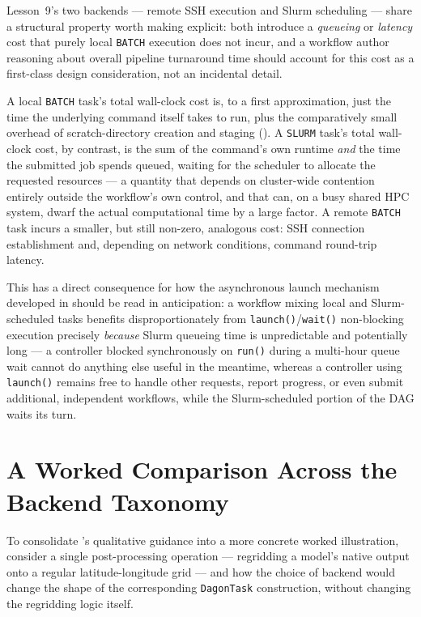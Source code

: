 Lesson~9's two backends --- remote SSH execution and Slurm scheduling ---
share a structural property worth making explicit: both introduce a
\emph{queueing} or \emph{latency} cost that purely local \texttt{BATCH}
execution does not incur, and a workflow author reasoning about overall
pipeline turnaround time should account for this cost as a first-class
design consideration, not an incidental detail.

A local \texttt{BATCH} task's total wall-clock cost is, to a first
approximation, just the time the underlying command itself takes to run,
plus the comparatively small overhead of scratch-directory creation and
staging (). A \texttt{SLURM} task's total wall-clock
cost, by contrast, is the sum of the command's own runtime \emph{and} the
time the submitted job spends queued, waiting for the scheduler to allocate
the requested resources --- a quantity that depends on cluster-wide
contention entirely outside the workflow's own control, and that can, on a
busy shared HPC system, dwarf the actual computational time by a large
factor. A remote \texttt{BATCH} task incurs a smaller, but still non-zero,
analogous cost: SSH connection establishment and, depending on network
conditions, command round-trip latency.

\begin{practicebox}
This has a direct consequence for how the asynchronous launch mechanism
developed in  should be read in anticipation: a
workflow mixing local and Slurm-scheduled tasks benefits disproportionately
from \texttt{launch()}/\texttt{wait()} non-blocking execution precisely
\emph{because} Slurm queueing time is unpredictable and potentially long ---
a controller blocked synchronously on \texttt{run()} during a multi-hour
queue wait cannot do anything else useful in the meantime, whereas a
controller using \texttt{launch()} remains free to handle other requests,
report progress, or even submit additional, independent workflows, while
the Slurm-scheduled portion of the DAG waits its turn.
\end{practicebox}

\section{A Worked Comparison Across the Backend Taxonomy}

To consolidate 's qualitative guidance into a
more concrete worked illustration, consider a single post-processing
operation --- regridding a model's native output onto a regular
latitude-longitude grid --- and how the choice of backend would change the
shape of the corresponding \texttt{DagonTask} construction, without changing
the regridding logic itself.

